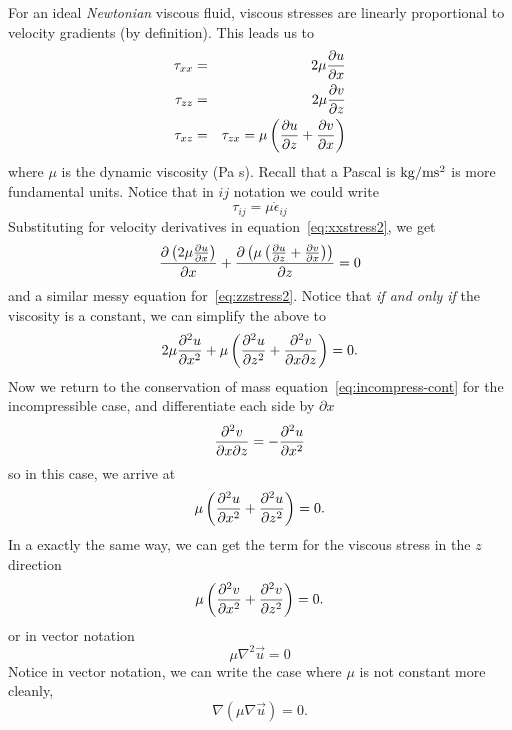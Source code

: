 \documentclass[12pt,twoside]{article}
\begin{document}
For an ideal {\em Newtonian} viscous fluid, viscous stresses are linearly
proportional to velocity gradients (by definition).   This leads us to
\begin{eqnarray}
\tau_{xx} & = & 2 \mu {{\partial u}\over{\partial x}} \\
\tau_{zz} & = & 2 \mu {{\partial v}\over{\partial z}} \\
\tau_{xz} & = & \tau_{zx} = \mu \left (  {{\partial u}\over{\partial z}} + 
{{\partial v}\over{\partial x}} \right )
\end{eqnarray}
where $\mu$ is the dynamic viscosity (Pa s).  Recall that a Pascal is ${\rm
kg} / {\rm m s^2}$ is more fundamental units.    Notice that in
$ij$ notation we could write
\begin{equation}
\tau_{ij} = \mu \dot\epsilon_{ij}
\end{equation}
Substituting for velocity derivatives in equation~\ref{eq:xxstress2}, we get
\begin{equation}
{ {\partial \left (2 \mu {{\partial u}\over{\partial x}} \right ) } \over
{\partial x} } + { {\partial \left ( \mu \left (  {{\partial u}\over{\partial z}}
+  {{\partial v}\over{\partial x}} \right ) \right )} \over {\partial z} } = 0
\end{equation}
and a similar messy equation for~\ref{eq:zzstress2}.   Notice that {\em if and
only if} the viscosity is a constant, we can simplify the above to
\begin{equation}  
2 \mu {{\partial^2 u}\over{\partial x^2}}   + 
\mu \left (  {{\partial^2 u}\over{\partial z^2 }} + 
{{\partial^2 v}\over{\partial x \partial z}} \right ) = 0.
\end{equation}
Now we return to the conservation of mass equation~\ref{eq:incompress-cont} for
the incompressible case, and differentiate each side by $\partial x$
\begin{equation}
{{\partial^2 v}\over{\partial x \partial z}} = - {{\partial^2 u}\over{\partial
x^2 }}
\end{equation}
so in this case, we arrive at 
\begin{equation}
\mu \left (  {{\partial^2 u}\over{\partial x^2 }} +  {{\partial^2
u}\over{\partial z^2}} \right ) = 0.
\end{equation}
In a exactly the same way, we can get the term for the viscous stress in the
$z$ direction
\begin{equation}
\mu \left (  {{\partial^2 v}\over{\partial x^2 }} +  {{\partial^2
v}\over{\partial z^2}} \right ) = 0.
\end{equation}
or in vector notation
\begin{equation}
\mu \nabla^2 \vec u = 0
\end{equation}
Notice in vector notation, we can write the case where $\mu$ is not constant
more cleanly,
\begin{equation}
\nabla ( \mu \nabla \vec u) = 0.
\end{equation}
\end{document}
